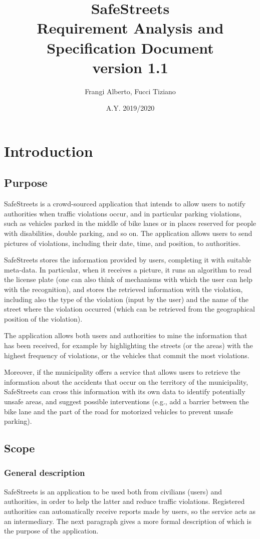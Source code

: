 \documentclass[12pt,a4paper]{report}
\title{SafeStreets \\ \Large Requirement Analysis and Specification Document \\ \large version 1.1}
\author{Frangi Alberto, Fucci Tiziano}
\date{A.Y. 2019/2020}
\begin{document}
\maketitle

\tableofcontents
\chapter{Introduction}
	\section{Purpose}
SafeStreets is a crowd-sourced application that intends to allow users to notify authorities when traffic violations occur, and in particular parking violations, such as vehicles parked in the middle of bike lanes or in places reserved for people with disabilities, double parking, and so on. The application allows users to send pictures of violations, including their date, time, and position, to authorities.
 
SafeStreets stores the information provided by users, completing it with suitable meta-data. In particular, when it receives a picture, it runs an algorithm to read the license plate (one can also think of mechanisms with which the user can help with the recognition), and stores the retrieved information with the violation, including also the type of the violation (input by the user) and the name of the street where the violation occurred (which can be retrieved from the geographical position of the violation). 

The application allows both users and authorities to mine the information that has been received, for example by highlighting the streets (or the areas) with the highest frequency of violations, or the vehicles that commit the most violations. 

Moreover, if the municipality offers a service that allows users to retrieve the information about the accidents that occur on the territory of the municipality, SafeStreets can cross this information with its own data to identify potentially unsafe areas, and suggest possible interventions (e.g., add a barrier between the bike lane and the part of the road for motorized vehicles to prevent unsafe parking).


	\section{Scope}
	\subsection{General description}
SafeStreets is an application to be used both from civilians (users) and authorities, in order to help the latter and reduce traffic violations. Registered authorities can automatically receive reports made by users, so the service acts as an intermediary. The next paragraph gives a more formal description of which is the purpose of the application.
\end{document}
